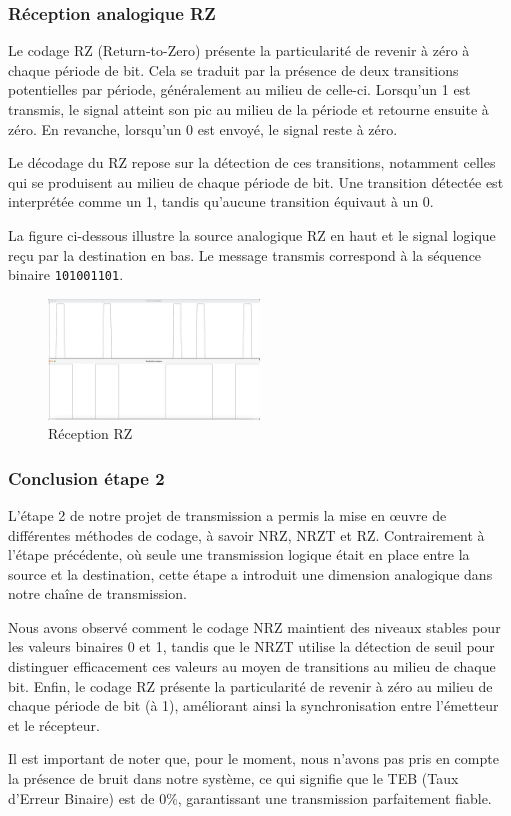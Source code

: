 \subsubsection{Réception analogique RZ}

Le codage RZ (Return-to-Zero) présente la particularité de revenir à zéro à chaque période de bit. Cela se traduit par la présence de deux transitions potentielles par période, généralement au milieu de celle-ci. Lorsqu'un 1 est transmis, le signal atteint son pic au milieu de la période et retourne ensuite à zéro. En revanche, lorsqu'un 0 est envoyé, le signal reste à zéro.

Le décodage du RZ repose sur la détection de ces transitions, notamment celles qui se produisent au milieu de chaque période de bit. Une transition détectée est interprétée comme un 1, tandis qu'aucune transition équivaut à un 0. 

La figure ci-dessous illustre la source analogique RZ en haut et le signal logique reçu par la destination en bas. Le message transmis correspond à la séquence binaire \texttt{101001101}.

\begin{figure}[H]
    \centering
    \includegraphics[width=0.5\textwidth]{img/etape2_reception_RZ.png}
    \caption{Réception RZ}
    \label{fig:teb1}
\end{figure}

\subsubsection{Conclusion étape 2}

L'étape 2 de notre projet de transmission a permis la mise en œuvre de différentes méthodes de codage, à savoir NRZ, NRZT et RZ. Contrairement à l'étape précédente, où seule une transmission logique était en place entre la source et la destination, cette étape a introduit une dimension analogique dans notre chaîne de transmission. 

Nous avons observé comment le codage NRZ maintient des niveaux stables pour les valeurs binaires 0 et 1, tandis que le NRZT utilise la détection de seuil pour distinguer efficacement ces valeurs au moyen de transitions au milieu de chaque bit. Enfin, le codage RZ présente la particularité de revenir à zéro au milieu de chaque période de bit (à 1), améliorant ainsi la synchronisation entre l'émetteur et le récepteur.

Il est important de noter que, pour le moment, nous n'avons pas pris en compte la présence de bruit dans notre système, ce qui signifie que le TEB (Taux d'Erreur Binaire) est de 0\%, garantissant une transmission parfaitement fiable. 